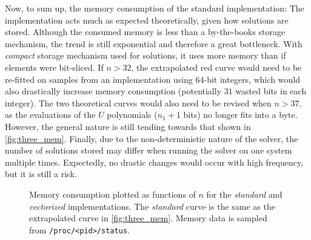 Now, to sum up, the memory consumption of the standard implementation: The implementation acts much as expected theoretically, given how solutions are stored. Although the consumed memory is less than a by-the-books storage mechanism, the trend is still exponential and therefore a great bottleneck. With \textit{compact} storage mechanism used for solutions, it uses more memory than if elements were bit-sliced. If $n > 32$, the extrapolated red curve would need to be re-fitted on samples from an implementation using 64-bit integers, which would also drastically increase memory consumption (potentially $31$ wasted bits in each integer). The two theoretical curves would also need to be revised when $n > 37$, as the evaluations of the $U$ polynomials ($n_1 + 1$ bits) no longer fits into a byte. However, the general nature is still tending towards that shown in \cref{fig:three_mem}. Finally, due to the non-deterministic nature of the solver, the number of solutions stored may differ when running the solver on one system multiple times. Expectedly, no drastic changes would occur with high frequency, but it is still a risk.

\begin{figure}[t]
    \centering
    \caption{Memory consumption plotted as functions of $n$ for the \textit{standard} and \textit{vectorized} implementations. The \textit{standard} curve is the same as the extrapolated curve in \cref{fig:three_mem}. Memory data is sampled from \texttt{/proc/<pid>/status}.} \label{fig:avx_simd_mem}
\end{figure}


